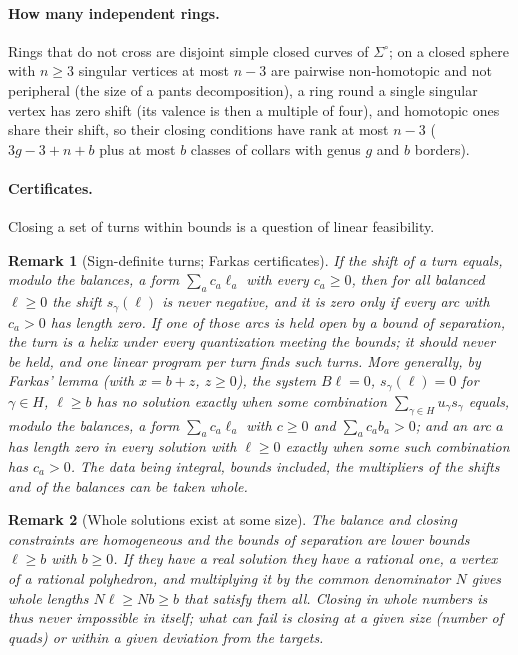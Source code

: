\documentclass[11pt,a4paper]{article}
\newtheorem{remark}{Remark}
\newcommand{\shift}{s}
\newcommand{\lean}[1]{\texttt{\detokenize{#1}}}
\newenvironment{evidence}[3][]{}{}
\begin{document}
\paragraph{How many independent rings.}
Rings that do not cross are disjoint simple closed curves of $\Sigma^\circ$;
on a closed sphere with $n \ge 3$ singular vertices at most $n - 3$ are
pairwise non-homotopic and not peripheral (the size of a pants
decomposition), a ring round a single singular vertex has zero shift (its
valence is then a multiple of four), and homotopic ones share their shift,
so their closing conditions have rank at most $n - 3$ ($3g - 3 + n + b$ plus at
most $b$ classes of collars with genus $g$ and $b$ borders).

\paragraph{Certificates.}
Closing a set of turns within bounds is a question of linear feasibility.

\begin{evidence}{lean}{\lean{TMesh.not_closable_iff}, \lean{TMesh.closable_iff}}
\begin{remark}[Sign-definite turns; Farkas certificates]\label{rem:definite}
If the shift of a turn equals, modulo the balances, a form $\sum_a c_a \ell_a$
with every $c_a \ge 0$, then for all balanced $\ell \ge 0$ the shift
$\shift_\gamma(\ell)$ is never negative, and it is zero only if every arc with
$c_a > 0$ has length zero. If one of those arcs is held open by a bound of
separation, the turn is a helix under every quantization meeting the bounds;
it should never be held, and one linear program per turn finds such turns.
More generally, by Farkas' lemma (with $x = b + z$, $z \ge 0$), the system
$B\ell = 0$, $\shift_\gamma(\ell) = 0$ for $\gamma \in H$, $\ell \ge b$ has no
solution exactly when some combination $\sum_{\gamma \in H} u_\gamma
\shift_\gamma$ equals, modulo the balances, a form $\sum_a c_a \ell_a$ with $c
\ge 0$ and $\sum_a c_a b_a > 0$; and an arc $a$ has length zero in every
solution with $\ell \ge 0$ exactly when some such combination has $c_a > 0$.
The data being integral, bounds included, the multipliers of the shifts and of
the balances can be taken whole.
\end{remark}
\end{evidence}

\begin{evidence}{lean}{\lean{whole_solution_of_real}, \lean{clear_denominators}}
\begin{remark}[Whole solutions exist at some size]\label{rem:exist}
The balance and closing constraints are homogeneous and the bounds of
separation are lower bounds $\ell \ge b$ with $b \ge 0$. If they have a real
solution they have a rational one, a vertex of a rational polyhedron, and
multiplying it by the common denominator $N$ gives whole lengths $N\ell \ge Nb
\ge b$ that satisfy them all. Closing in whole numbers is thus never
impossible in itself; what can fail is closing \emph{at a given size} (number
of quads) or within a given deviation from the targets.
\end{remark}
\end{evidence}
\end{document}
